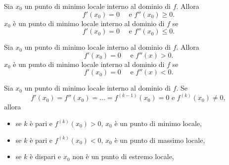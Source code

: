 \begin{theorem}
    Sia $x_0$ un punto di minimo locale interno al dominio di $f$. Allora
    \begin{equation*}
        f'(x_0)=0\quad\text{ e }f''(x_0)\geq 0.
    \end{equation*}
    $x_0$ è un punto di minimo locale interno al dominio di $f$ se
    \begin{equation*}
        f'(x_0)=0\quad\text{ e }f''(x_0)\leq 0.
    \end{equation*}
\end{theorem}

\begin{theorem}
    Sia $x_0$ un punto di minimo locale interno al dominio di $f$. Allora
    \begin{equation*}
        f'(x_0)=0\quad\text{ e }f''(x) > 0.
    \end{equation*}
    $x_0$ è un punto di minimo locale interno al dominio di $f$ se
    \begin{equation*}
        f'(x_0)=0\quad\text{ e }f''(x) < 0.
    \end{equation*}
\end{theorem}

\begin{theorem}
    Sia $x_0$ un punto di minimo locale interno al dominio di $f$. Se
    \begin{equation*}
        f'(x_0)=f''(x_0)=\hdots=f^{(k-1)}(x_0)=0 \text{ e } f^{(k)}(x_0)\neq 0,
    \end{equation*}
    allora
    \begin{itemize}
        \item se $k$ è pari e $f^{(k)}(x_0)>0$, $x_0$ è un punto di minimo locale,
        \item se $k$ è pari e $f^{(k)}(x_0)<0$, $x_0$ è un punto di massimo locale,
        \item se $k$ è dispari e $x_0$ non è un punto di estremo locale,
    \end{itemize}
\end{theorem}